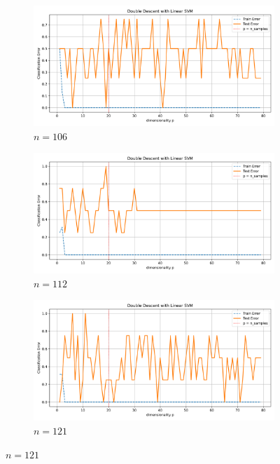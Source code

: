 \documentclass[twoside,10pt]{article}
\begin{document}
\begin{figure}[htb]
  \begin{subfigure}[b]{\imgwidth}
    \includegraphics[width=\linewidth]{img_qq/risk_curve_n80.png}
    \caption{$n=106$}\label{fig:2i}
  \end{subfigure}%
  \hfill
  \begin{subfigure}[b]{\imgwidth}
    \includegraphics[width=\linewidth]{img_qq/risk_curve_n100.png}
    \caption{$n=112$}\label{fig:2j1}
  \end{subfigure}%
  \hfill
  \begin{subfigure}[b]{\imgwidth}
    \includegraphics[width=\linewidth]{img_qq/risk_curve_n120.png}
    \caption{$n=121$}\label{fig:2k1}

\end{subfigure}
\end{figure}
\end{document}
